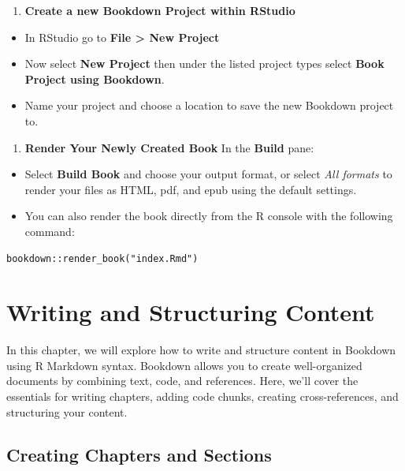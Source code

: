 \documentclass[
]{book}
\providecommand{\tightlist}{%
  \setlength{\itemsep}{0pt}\setlength{\parskip}{0pt}}
\theoremstyle{definition}
\theoremstyle{definition}
\theoremstyle{definition}
\theoremstyle{definition}
\theoremstyle{remark}
\begin{document}
\begin{enumerate}
\def\labelenumi{\arabic{enumi}.}
\setcounter{enumi}{3}
\tightlist
\item
  \textbf{Create a new Bookdown Project within RStudio}
\end{enumerate}

\begin{itemize}
\tightlist
\item
  In RStudio go to \textbf{File \textgreater{} New Project}
\item
  Now select \textbf{New Project} then under the listed project types select \textbf{Book Project using Bookdown}.
\item
  Name your project and choose a location to save the new Bookdown project to.
\end{itemize}

\begin{enumerate}
\def\labelenumi{\arabic{enumi}.}
\setcounter{enumi}{4}
\tightlist
\item
  \textbf{Render Your Newly Created Book}
  In the \textbf{Build} pane:
\end{enumerate}

\begin{itemize}
\tightlist
\item
  Select \textbf{Build Book} and choose your output format, or select \emph{All formats} to render your files as HTML, pdf, and epub using the default settings.
\item
  You can also render the book directly from the R console with the following command:
\end{itemize}

\begin{verbatim}
bookdown::render_book("index.Rmd")
\end{verbatim}

\chapter{Writing and Structuring Content}\label{writing-and-structuring-content}

In this chapter, we will explore how to write and structure content in Bookdown using R Markdown syntax. Bookdown allows you to create well-organized documents by combining text, code, and references. Here, we'll cover the essentials for writing chapters, adding code chunks, creating cross-references, and structuring your content.

\section{Creating Chapters and Sections}\label{creatingchapters}
\end{document}
